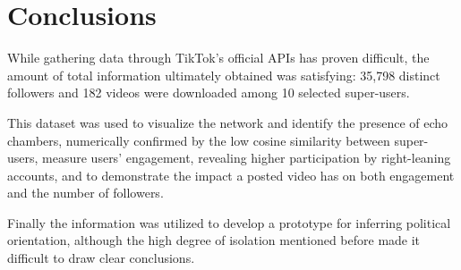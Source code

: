 \section{Conclusions}

While gathering data through TikTok's official APIs has proven difficult, the amount of total information ultimately obtained was satisfying: 35,798 distinct followers and 182 videos were downloaded among 10 selected super-users.

This dataset was used to visualize the network and identify the presence of echo chambers, numerically confirmed by the low cosine similarity between super-users, measure users' engagement, revealing higher participation by right-leaning accounts, and to demonstrate the impact a posted video has on both engagement and the number of followers.

Finally the information was utilized to develop a prototype for inferring political orientation, although the high degree of isolation mentioned before made it difficult to draw clear conclusions.

